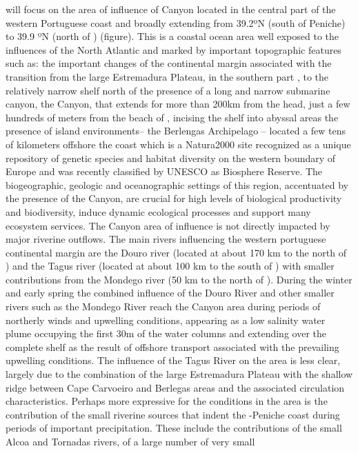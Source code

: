 \proj will focus on the area of influence of \naz Canyon located in
the central part of the western Portuguese coast and broadly extending
from 39.2ºN (south of Peniche) to 39.9 ºN (north of \naz)
(figure). This is a coastal ocean area well exposed to the influences
of the North Atlantic and marked by important topographic features
such as: the important changes of the continental margin associated
with the transition from the large Estremadura Plateau, in the
southern part , to the relatively narrow shelf north of \naz the
presence of a long and narrow submarine canyon, the \naz Canyon, that
extends for more than 200km from the head, just a few hundreds of
meters from the beach of \naze, incising the shelf into abyssal areas
the presence of island environments– the Berlengas Archipelago –
located a few tens of kilometers offshore the coast which is a
Natura2000 site recognized as a unique repository of genetic species
and habitat diversity on the western boundary of Europe and was
recently classified by UNESCO as Biosphere Reserve. The biogeographic,
geologic and oceanographic settings of this region, accentuated by the
presence of the \naz Canyon, are crucial for high levels of biological
productivity and biodiversity, induce dynamic ecological processes and
support many ecosystem services.  The \naz Canyon area of influence is
not directly impacted by major riverine outflows. The main rivers
influencing the western portuguese continental margin are the Douro
river (located at about 170 km to the north of \naze) and the Tagus
river (located at about 100 km to the south of \naze) with smaller
contributions from the Mondego river (50 km to the north of
\naze). During the winter and early spring the combined influence of
the Douro River and other smaller rivers such as the Mondego River
reach the \naz Canyon area during periods of northerly winds and
upwelling conditions, appearing as a low salinity water plume
occupying the first 30m of the water columns and extending over the
complete shelf as the result of offshore transport associated with the
prevailing upwelling conditions.  The influence of the Tagus River on
the area is less clear, largely due to the combination of the large
Estremadura Plateau with the shallow ridge between Cape Carvoeiro and
Berlegas areas and the associated circulation characteristics. Perhaps
more expressive for the conditions in the area is the contribution of
the small riverine sources that indent the \naze-Peniche coast during
periods of important precipitation. These include the contributions of
the small Alcoa and Tornadas rivers, of a large number of very small
